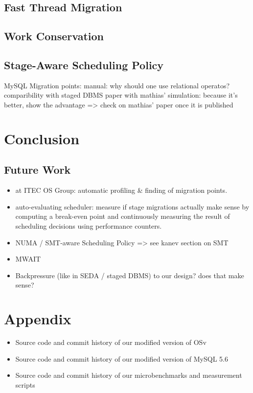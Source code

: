 \documentclass[12pt,a4paper]{book}
\begin{document}
\section{Fast Thread Migration}
\section{Work Conservation}
\section{Stage-Aware Scheduling Policy}
MySQL Migration points:
    manual: why should one use relational operatos? comparibility with staged DBMS paper
    with mathias' simulation: because it's better, show the advantage => check on mathias' paper once it is published
\chapter{Conclusion}\label{ch:concl}
\blindtext
\section{Future Work}
\begin{itemize}
    \item at ITEC OS Group: automatic profiling \& finding of migration points.
    \item auto-evaluating scheduler: measure if stage migrations actually make sense by computing a break-even point and continuously measuring the result of scheduling decisions using performance counters.
    \item NUMA / SMT-aware Scheduling Policy => see kanev section on SMT
    \item MWAIT
    \item Backpressure (like in SEDA / staged DBMS) to our design? does that make sense?
\end{itemize}

\backmatter

\chapter{Appendix}
\blindtext
\begin{itemize}
    \item Source code and commit history of our modified version of OSv
    \item Source code and commit history of our modified version of MySQL 5.6
    \item Source code and commit history of our microbenchmarks and measurement scripts
\end{itemize}

\cleardoublepage
{}
{}
\printbibliography
\end{document}
